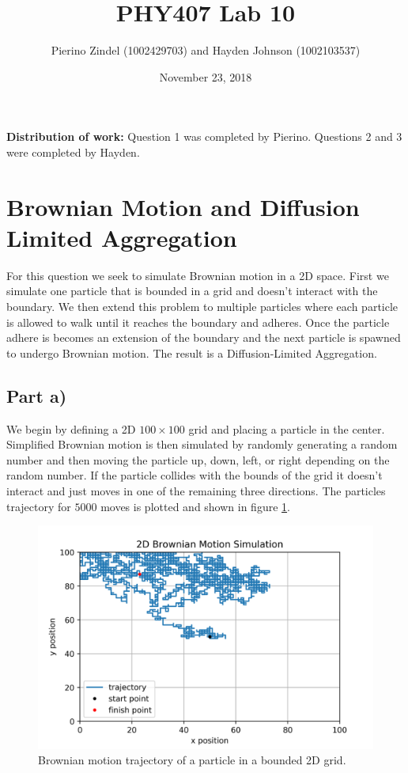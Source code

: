 \documentclass{article}
\title{PHY407 Lab 10}
\author{Pierino Zindel (1002429703) and Hayden Johnson (1002103537)}
\date{November 23, 2018}
\begin{document}
\maketitle

\noindent \textbf{Distribution of work:} Question 1 was completed by Pierino. Questions 2 and 3 were completed by Hayden.

\section{Brownian Motion and Diffusion Limited Aggregation}
For this question we seek to simulate Brownian motion in a 2D space. First we simulate one particle that is bounded in a grid and doesn't interact with the boundary. We then extend this problem to multiple particles where each particle is allowed to walk until it reaches the boundary and adheres. Once the particle adhere is becomes an extension of the boundary and the next particle is spawned to undergo Brownian motion. The result is a Diffusion-Limited Aggregation.

\subsection{Part a)}
We begin by defining a 2D $100\times 100$ grid and placing a particle in the center. Simplified Brownian motion is then simulated by randomly generating a random number and then moving the particle up, down, left, or right depending on the random number. If the particle collides with the bounds of the grid it doesn't interact and just moves in one of the remaining three directions. The particles trajectory for $5000$ moves is plotted and shown in figure \ref{fig:q1_a}.

\begin{figure}[H]
	\centering
	\includegraphics[width=\linewidth]{../images/Brownian_motion.png}
	\caption{Brownian motion trajectory of a particle in a bounded 2D grid.}
	\label{fig:q1_a}
\end{figure}
\end{document}
